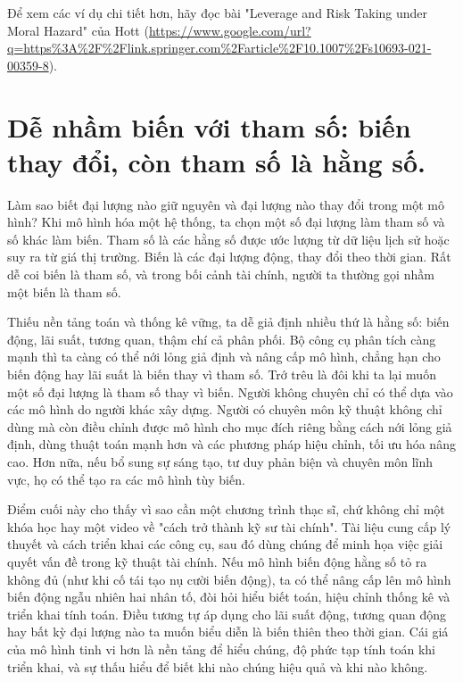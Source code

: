 Để xem các ví dụ chi tiết hơn, hãy đọc bài "Leverage and Risk Taking under Moral Hazard" của Hott (\url{https://www.google.com/url?q=https\%3A\%2F\%2Flink.springer.com\%2Farticle\%2F10.1007\%2Fs10693-021-00359-8}).

\section{Dễ nhầm biến với tham số: biến thay đổi, còn tham số là hằng số.}

Làm sao biết đại lượng nào giữ nguyên và đại lượng nào thay đổi trong một mô hình? Khi mô hình hóa một hệ thống, ta chọn một số đại lượng làm tham số và số khác làm biến. Tham số là các hằng số được ước lượng từ dữ liệu lịch sử hoặc suy ra từ giá thị trường. Biến là các đại lượng động, thay đổi theo thời gian. Rất dễ coi biến là tham số, và trong bối cảnh tài chính, người ta thường gọi nhầm một biến là tham số.

Thiếu nền tảng toán và thống kê vững, ta dễ giả định nhiều thứ là hằng số: biến động, lãi suất, tương quan, thậm chí cả phân phối. Bộ công cụ phân tích càng mạnh thì ta càng có thể nới lỏng giả định và nâng cấp mô hình, chẳng hạn cho biến động hay lãi suất là biến thay vì tham số. Trớ trêu là đôi khi ta lại muốn một số đại lượng là tham số thay vì biến. Người không chuyên chỉ có thể dựa vào các mô hình do người khác xây dựng. Người có chuyên môn kỹ thuật không chỉ dùng mà còn điều chỉnh được mô hình cho mục đích riêng bằng cách nới lỏng giả định, dùng thuật toán mạnh hơn và các phương pháp hiệu chỉnh, tối ưu hóa nâng cao. Hơn nữa, nếu bổ sung sự sáng tạo, tư duy phản biện và chuyên môn lĩnh vực, họ có thể tạo ra các mô hình tùy biến.

Điểm cuối này cho thấy vì sao cần một chương trình thạc sĩ, chứ không chỉ một khóa học hay một video về "cách trở thành kỹ sư tài chính". Tài liệu cung cấp lý thuyết và cách triển khai các công cụ, sau đó dùng chúng để minh họa việc giải quyết vấn đề trong kỹ thuật tài chính. Nếu mô hình biến động hằng số tỏ ra không đủ (như khi cố tái tạo nụ cười biến động), ta có thể nâng cấp lên mô hình biến động ngẫu nhiên hai nhân tố, đòi hỏi hiểu biết toán, hiệu chỉnh thống kê và triển khai tính toán. Điều tương tự áp dụng cho lãi suất động, tương quan động hay bất kỳ đại lượng nào ta muốn biểu diễn là biến thiên theo thời gian. Cái giá của mô hình tinh vi hơn là nền tảng để hiểu chúng, độ phức tạp tính toán khi triển khai, và sự thấu hiểu để biết khi nào chúng hiệu quả và khi nào không.

